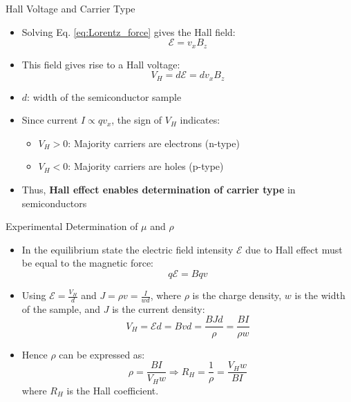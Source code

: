 \begin{frame}{Hall Voltage and Carrier Type}
    \begin{itemize}
        \item Solving Eq. \ref{eq:Lorentz_force} gives the Hall field:
        \begin{equation}
            \mathcal{E} = v_x B_z 
        \end{equation}
        \item This field gives rise to a Hall voltage:
        \begin{equation}
        V_H = d \mathcal{E} = d v_x B_z
        \end{equation}
        \item $d$: width of the semiconductor sample
        \item Since current $I \propto q v_x$, the sign of $V_H$ indicates:
        \begin{itemize}
            \item $V_H > 0$: Majority carriers are electrons (n-type)
            \item $V_H < 0$: Majority carriers are holes (p-type)
        \end{itemize}
        \item Thus, \textbf{Hall effect enables determination of carrier type} in semiconductors
    \end{itemize}
\end{frame}


\begin{frame}{Experimental Determination of $\mu$ and $\rho$}
    \begin{itemize}
        \item In the equilibrium state the electric field intensity $\mathcal{E}$ due to Hall effect must be equal to the magnetic force:
        \begin{equation}
        q\mathcal{E} = Bqv \tag{2-21}
        \end{equation}
        \item Using $\mathcal{E} = \frac{V_H}{d}$ and $J = \rho v = \frac{I}{wd}$, where $\rho$ is the charge density, $w$ is the width of the sample, and $J$ is the current density:
        \begin{equation}
        V_H = \mathcal{E}d = Bvd = \frac{BJd}{\rho} = \frac{BI}{\rho w} \tag{2-22}
        \end{equation}
        \item Hence $\rho$ can be expressed as:
        \begin{equation}
        \rho = \frac{BI}{V_H w} \Rightarrow R_H = \frac{1}{\rho} = \frac{V_H w}{BI} \tag{2-23, 2-24}
        \end{equation}
        where $R_H$ is the Hall coefficient.
    \end{itemize}
\end{frame}

